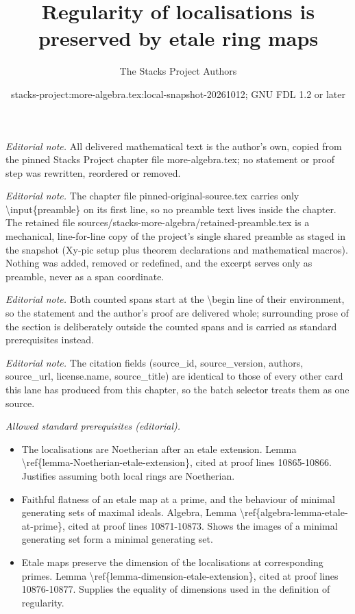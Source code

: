 \documentclass[10pt,a4paper]{amsart}
\title{Regularity of localisations is preserved by etale ring maps}
\author{The Stacks Project Authors}
\date{stacks-project:more-algebra.tex:local-snapshot-20261012; GNU FDL 1.2 or later}
\theoremstyle{plain}
\theoremstyle{definition}
\theoremstyle{remark}
\numberwithin{equation}{subsection}
\begin{document}
\maketitle
\setcounter{subsection}{1}
\noindent\textit{Editorial note.} All delivered mathematical text is the author's own, copied from the pinned Stacks Project chapter file more-algebra.tex; no statement or proof step was rewritten, reordered or removed.\par\medskip
\noindent\textit{Editorial note.} The chapter file pinned-original-source.tex carries only \textbackslash{}input\{preamble\} on its first line, so no preamble text lives inside the chapter. The retained file sources/stacks-more-algebra/retained-preamble.tex is a mechanical, line-for-line copy of the project's single shared preamble as staged in the snapshot (Xy-pic setup plus theorem declarations and mathematical macros). Nothing was added, removed or redefined, and the excerpt serves only as preamble, never as a span coordinate.\par\medskip
\noindent\textit{Editorial note.} Both counted spans start at the \textbackslash{}begin line of their environment, so the statement and the author's proof are delivered whole; surrounding prose of the section is deliberately outside the counted spans and is carried as standard prerequisites instead.\par\medskip
\noindent\textit{Editorial note.} The citation fields (source\_id, source\_version, authors, source\_url, license.name, source\_title) are identical to those of every other card this lane has produced from this chapter, so the batch selector treats them as one source.\par\medskip
\noindent\textit{Allowed standard prerequisites (editorial).}\begin{itemize}
\item The localisations are Noetherian after an etale extension. Lemma \textbackslash{}ref\{lemma-Noetherian-etale-extension\}, cited at proof lines 10865-10866. Justifies assuming both local rings are Noetherian.
\item Faithful flatness of an etale map at a prime, and the behaviour of minimal generating sets of maximal ideals. Algebra, Lemma \textbackslash{}ref\{algebra-lemma-etale-at-prime\}, cited at proof lines 10871-10873. Shows the images of a minimal generating set form a minimal generating set.
\item Etale maps preserve the dimension of the localisations at corresponding primes. Lemma \textbackslash{}ref\{lemma-dimension-etale-extension\}, cited at proof lines 10876-10877. Supplies the equality of dimensions used in the definition of regularity.
\end{itemize}\medskip
\end{document}
